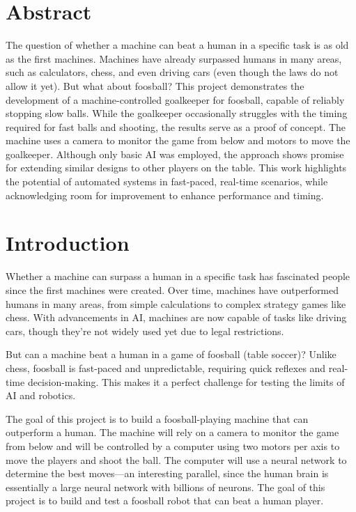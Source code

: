 \section{Abstract}\label{sec:abstract}
The question of whether a machine can beat a human in a specific task is as old as the first machines.
Machines have already surpassed humans in many areas, such as calculators, chess, and even driving cars (even though the laws do not allow it yet).
But what about foosball?
This project demonstrates the development of a machine-controlled goalkeeper for foosball, capable of reliably stopping slow balls.
While the goalkeeper occasionally struggles with the timing required for fast balls and shooting, the results serve as a proof of concept.
The machine uses a camera to monitor the game from below and motors to move the goalkeeper.
Although only basic AI was employed, the approach shows promise for extending similar designs to other players on the table.
This work highlights the potential of automated systems in fast-paced, real-time scenarios, while acknowledging room for improvement to enhance performance and timing.

\section{Introduction}\label{sec:introduction}
Whether a machine can surpass a human in a specific task has fascinated people since the first machines were created.
Over time, machines have outperformed humans in many areas, from simple calculations to complex strategy games like chess.
With advancements in AI, machines are now capable of tasks like driving cars, though they’re not widely used yet due to legal restrictions.

But can a machine beat a human in a game of foosball (table soccer)?
Unlike chess, foosball is fast-paced and unpredictable, requiring quick reflexes and real-time decision-making.
This makes it a perfect challenge for testing the limits of AI and robotics.

The goal of this project is to build a foosball-playing machine that can outperform a human.
The machine will rely on a camera to monitor the game from below and will be controlled by a computer using two motors per axis to move the players and shoot the ball.
The computer will use a neural network to determine the best moves—an interesting parallel, since the human brain is essentially a large neural network with billions of neurons.
The goal of this project is to build and test a foosball robot that can beat a human player.

